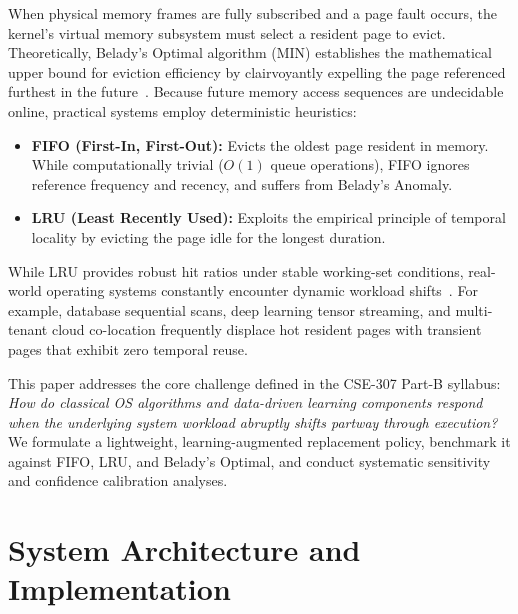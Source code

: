 \documentclass[10pt,twocolumn,a4paper]{article}
\begin{document}
When physical memory frames are fully subscribed and a page fault occurs, the kernel's virtual memory subsystem must select a resident page to evict. Theoretically, Belady's Optimal algorithm (MIN) establishes the mathematical upper bound for eviction efficiency by clairvoyantly expelling the page referenced furthest in the future~\cite{belady1966study}. Because future memory access sequences are undecidable online, practical systems employ deterministic heuristics:
\begin{itemize}
    \item \textbf{FIFO (First-In, First-Out):} Evicts the oldest page resident in memory. While computationally trivial ($O(1)$ queue operations), FIFO ignores reference frequency and recency, and suffers from Belady's Anomaly.
    \item \textbf{LRU (Least Recently Used):} Exploits the empirical principle of temporal locality by evicting the page idle for the longest duration.
\end{itemize}

While LRU provides robust hit ratios under stable working-set conditions, real-world operating systems constantly encounter dynamic workload shifts~\cite{liu2020learned, megiddo2003arc}. For example, database sequential scans, deep learning tensor streaming, and multi-tenant cloud co-location frequently displace hot resident pages with transient pages that exhibit zero temporal reuse.

This paper addresses the core challenge defined in the CSE-307 Part-B syllabus: \textit{How do classical OS algorithms and data-driven learning components respond when the underlying system workload abruptly shifts partway through execution?} We formulate a lightweight, learning-augmented replacement policy, benchmark it against FIFO, LRU, and Belady's Optimal, and conduct systematic sensitivity and confidence calibration analyses.

\section{System Architecture and Implementation}
\end{document}
